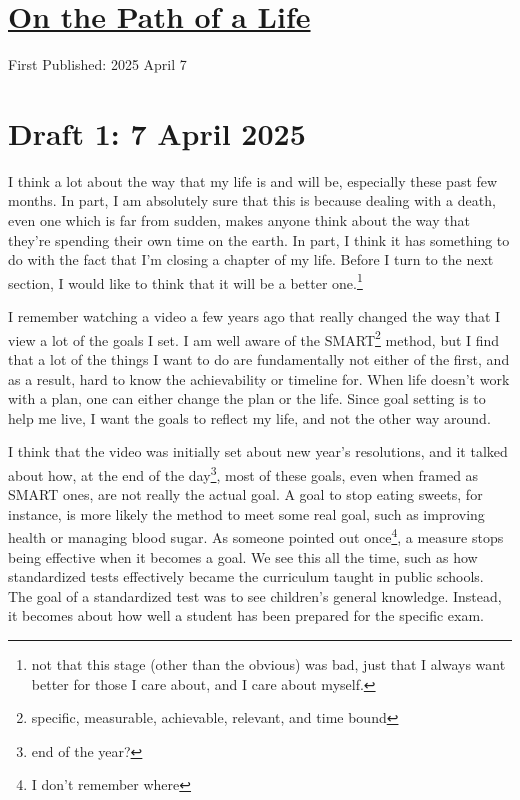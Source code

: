 \documentclass[12pt]{article}
\renewcommand{\,}{\textsuperscript{,}}
\begin{document}
  
\doublespacing  
\section{\href{path-of-life.html}{On the Path of a Life}}  
First Published: 2025 April 7

\section{Draft 1: 7 April 2025}

I think a lot about the way that my life is and will be, especially these past few months.  
In part, I am absolutely sure that this is because dealing with a death, even one which is far from sudden, makes anyone think about the way that they're spending their own time on the earth.  
In part, I think it has something to do with the fact that I'm closing a chapter of my life.  
Before I turn to the next section, I would like to think that it will be a better one.\footnote{not that this stage (other than the obvious) was bad, just that I always want better for those I care about, and I care about myself.}

I remember watching a video a few years ago that really changed the way that I view a lot of the goals I set.  
I am well aware of the SMART\footnote{specific, measurable, achievable, relevant, and time bound} method, but I find that a lot of the things I want to do are fundamentally not either of the first, and as a result, hard to know the achievability or timeline for.  
When life doesn't work with a plan, one can either change the plan or the life.  
Since goal setting is to help me live, I want the goals to reflect my life, and not the other way around.

I think that the video was initially set about new year's resolutions, and it talked about how, at the end of the day\footnote{end of the year?}, most of these goals, even when framed as SMART ones, are not really the actual goal.  
A goal to stop eating sweets, for instance, is more likely the method to meet some real goal, such as improving health or managing blood sugar.  
As someone pointed out once\footnote{I don't remember where}, a measure stops being effective when it becomes a goal.  
We see this all the time, such as how standardized tests effectively became the curriculum taught in public schools.  
The goal of a standardized test was to see children's general knowledge.  
Instead, it becomes about how well a student has been prepared for the specific exam.
\end{document}

